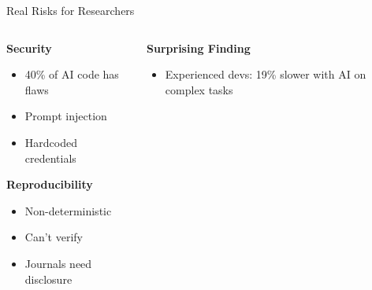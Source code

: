 \documentclass[aspectratio=169]{beamer}
\begin{document}
\begin{frame}{Real Risks for Researchers}
  \begin{columns}[T]
    \begin{column}{0.48\textwidth}
      \textbf{Security}\supercite{security2025ai}
      \begin{itemize}
        \item 40\% of AI code has flaws
        \item Prompt injection
        \item Hardcoded credentials
      \end{itemize}
      
      \vspace{0.5cm}
      
      \textbf{Reproducibility}
      \begin{itemize}
        \item Non-deterministic
        \item Can't verify
        \item Journals need disclosure
      \end{itemize}
    \end{column}
    \begin{column}{0.48\textwidth}
      \textbf{Surprising Finding}\supercite{metr2025study}
      \begin{itemize}
        \item Experienced devs: 19\% slower with AI on complex tasks
      \end{itemize}
    \end{column}
  \end{columns}
\end{frame}
\end{document}
